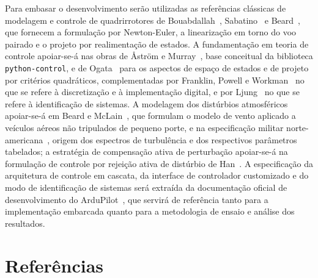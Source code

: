 \documentclass[12pt,a4paper]{article}
\begin{document}
Para embasar o desenvolvimento serão utilizadas as referências clássicas de
modelagem e controle de quadrirrotores de Bouabdallah~\cite{bouabdallah2007},
Sabatino~\cite{sabatino2015} e Beard~\cite{beard2008}, que fornecem a formulação por
Newton-Euler, a linearização em torno do voo pairado e o projeto por realimentação
de estados. A fundamentação em teoria de controle apoiar-se-á nas obras de Åström e
Murray~\cite{astrom2008}, base conceitual da biblioteca \texttt{python-control}, e de
Ogata~\cite{ogata2010} para os aspectos de espaço de estados e de projeto por
critérios quadráticos, complementadas por Franklin, Powell e
Workman~\cite{franklin1998} no que se refere à discretização e à implementação
digital, e por Ljung~\cite{ljung1999} no que se refere à identificação de sistemas. A
modelagem dos distúrbios atmosféricos apoiar-se-á em Beard e McLain~\cite{beard2012},
que formulam o modelo de vento aplicado a veículos aéreos não tripulados de pequeno
porte, e na especificação militar norte-americana~\cite{mil8785c}, origem dos
espectros de turbulência e dos respectivos parâmetros tabelados; a estratégia de
compensação ativa de perturbação apoiar-se-á na formulação de controle por rejeição
ativa de distúrbio de Han~\cite{han2009}.
A especificação da arquitetura de controle em cascata, da interface de controlador
customizado e do modo de identificação de sistemas será extraída da documentação
oficial de desenvolvimento do ArduPilot~\cite{ardupilotdev}, que servirá de
referência tanto para a implementação embarcada quanto para a metodologia de ensaio
e análise dos resultados.

\section*{Referências}
\end{document}
